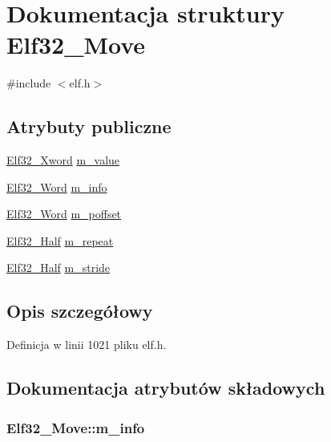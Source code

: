 \hypertarget{struct_elf32___move}{\section{Dokumentacja struktury Elf32\-\_\-\-Move}
\label{struct_elf32___move}
}


{\ttfamily \#include $<$elf.\-h$>$}

\subsection*{Atrybuty publiczne}
\begin{DoxyCompactItemize}
\item 
\hyperlink{elf_8h_a06e429ed15bc1257d859cca67c4dddd9}{Elf32\-\_\-\-Xword} \hyperlink{struct_elf32___move_ab9db1554472a8b54101e38298aabde19}{m\-\_\-value}
\item 
\hyperlink{elf_8h_af5924ece606c732e86f8263a19408e45}{Elf32\-\_\-\-Word} \hyperlink{struct_elf32___move_a25c402d8b1991f61f6ecc539368cd99a}{m\-\_\-info}
\item 
\hyperlink{elf_8h_af5924ece606c732e86f8263a19408e45}{Elf32\-\_\-\-Word} \hyperlink{struct_elf32___move_a4b1119df05b7672effd0afb09b258f85}{m\-\_\-poffset}
\item 
\hyperlink{elf_8h_a2ff0787d7d1bae0f251192806a2974ca}{Elf32\-\_\-\-Half} \hyperlink{struct_elf32___move_a84620f9a22f6a4b0f8a8a6c4e332f600}{m\-\_\-repeat}
\item 
\hyperlink{elf_8h_a2ff0787d7d1bae0f251192806a2974ca}{Elf32\-\_\-\-Half} \hyperlink{struct_elf32___move_a85ca12bb9ac30146a8533fccfe601b43}{m\-\_\-stride}
\end{DoxyCompactItemize}


\subsection{Opis szczegółowy}


Definicja w linii 1021 pliku elf.\-h.



\subsection{Dokumentacja atrybutów składowych}
\hypertarget{struct_elf32___move_a25c402d8b1991f61f6ecc539368cd99a}{
\subsubsection[{m\-\_\-info}]{ Elf32\-\_\-\-Move\-::m\-\_\-info}}\label{struct_elf32___move_a25c402d8b1991f61f6ecc539368cd99a}


